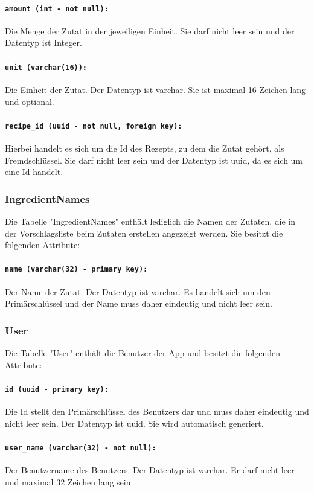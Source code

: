 \documentclass{entwurfsheft}
\begin{document}
\paragraph{\texttt{amount (int - not null):}} Die Menge der Zutat in der jeweiligen Einheit. Sie darf nicht leer sein und der Datentyp ist Integer.
\paragraph{\texttt{unit (varchar(16)):}} Die Einheit der Zutat. Der Datentyp ist \Gls{varchar}. Sie ist maximal 16 Zeichen lang und optional.
\paragraph{\texttt{recipe\_id (uuid - not null, foreign key):}} Hierbei handelt es sich um die Id des Rezepts, zu dem die Zutat gehört, als Fremdschlüssel. Sie darf nicht leer sein und der Datentyp ist \Gls{uuid}, da es sich um eine Id handelt.
\newpage
\subsubsection{IngredientNames}
Die Tabelle "IngredientNames" enthält lediglich die Namen der Zutaten, die in der Vorschlagsliste beim Zutaten erstellen angezeigt werden. Sie besitzt die folgenden Attribute:
\paragraph{\texttt{name (varchar(32) - primary key):}} Der Name der Zutat. Der Datentyp ist \Gls{varchar}. Es handelt sich um den Primärschlüssel und der Name muss daher eindeutig und nicht leer sein.
\newpage
\subsubsection{User}
Die Tabelle "User" enthält die Benutzer der App und besitzt die folgenden Attribute:
\paragraph{\texttt{id (uuid - primary key):}} Die Id stellt den Primärschlüssel des Benutzers dar und muss daher eindeutig und nicht leer sein. Der Datentyp ist \Gls{uuid}. Sie wird automatisch generiert.
\paragraph{\texttt{user\_name (varchar(32) - not null):}} Der Benutzername des Benutzers. Der Datentyp ist \Gls{varchar}. Er darf nicht leer und maximal 32 Zeichen lang sein.
\end{document}
